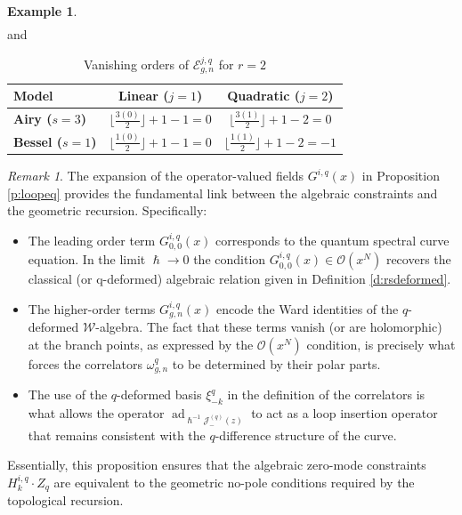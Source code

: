 \documentclass[reqno,11pt]{amsart}
\theoremstyle{plain}
\theoremstyle{definition}
\newtheorem{example}[theorem]{Example}
\theoremstyle{remark}
\newtheorem{remark}[theorem]{Remark}
\numberwithin{equation}{section}
\newcommand{\mc}[1]{\mathcal{#1}}
\newcommand{\1}{\mathds{1}}
\newcommand{\2}{\frac{1}{2}}
\DeclareMathOperator{\ad}{ad}
\begin{document}
{{\begin{example}
\begin{align}
										\end{align}
										and
										\begin{table}[h!]
											\centering
											\renewcommand{\arraystretch}{2}
											\begin{tabular}{|l|c|c|}
												\hline
												\textbf{Model} & \textbf{Linear ($j=1$)} & \textbf{Quadratic ($j=2$)} \\ \hline
												\textbf{Airy ($s=3$)} & $\lfloor \frac{3(0)}{2} \rfloor + 1 - 1 = 0$ & $\lfloor \frac{3(1)}{2} \rfloor + 1 - 2 = 0$ \\ \hline
												\textbf{Bessel ($s=1$)} & $\lfloor \frac{1(0)}{2} \rfloor + 1 - 1 = 0$ & $\lfloor \frac{1(1)}{2} \rfloor + 1 - 2 = -1$ \\ \hline
											\end{tabular}
											\caption{Vanishing orders of $\mathcal{E}^{j,q}_{g,n}$ for $r=2$}
										\end{table}
								\end{example}}
								\begin{remark}
									The expansion of the operator-valued fields $G^{i,q}(x)$ in Proposition \ref{p:loopeq} provides the fundamental link between the algebraic constraints and the geometric recursion. Specifically:
									\begin{itemize}
										\item[(a)] The leading order term $G^{i,q}_{0,0}(x)$ corresponds to the quantum spectral curve equation. In the limit $\hslash \rightarrow 0$ the condition $G^{i,q}_{0,0}(x)\in \mathcal{O}(x^N)$ recovers the classical (or q-deformed) algebraic relation given in Definition \ref{d:rsdeformed}.
										\item[(b)] The higher-order terms $G^{i,q}_{g,n}(x)$ encode the Ward identities of the $q$-deformed $\mathcal{W}$-algebra. The fact that these terms vanish (or are holomorphic) at the branch points, as expressed by the $\mathcal{O}(x^N)$ condition, is precisely what forces the correlators $\omega^q_{g,n}$ to be determined by their polar parts.
										\item[(c)] The use of the $q$-deformed basis $\xi^{q}_{-k}$  in the definition of the correlators is what allows the operator $\ad_{\hslash^{-1}\mc{J}^{(q)}_-(z)}$ to act as a loop insertion operator that remains consistent with the $q$-difference structure of the curve.
									\end{itemize}
									Essentially, this proposition ensures that the algebraic zero-mode constraints $H^{i,q}_k\cdot Z_q$ are equivalent to the geometric no-pole conditions required by the topological recursion.
								\end{remark}
								
}
\end{document}
